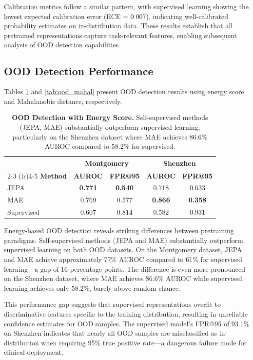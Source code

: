 \documentclass[11pt,a4paper]{article}
\begin{document}
Calibration metrics follow a similar pattern, with supervised learning showing the lowest expected calibration error (ECE = 0.007), indicating well-calibrated probability estimates on in-distribution data. These results establish that all pretrained representations capture task-relevant features, enabling subsequent analysis of OOD detection capabilities.

\subsection{OOD Detection Performance}

Tables \ref{tab:ood_energy} and \ref{tab:ood_mahal} present OOD detection results using energy score and Mahalanobis distance, respectively.

\begin{table}[h]
\centering
\caption{\textbf{OOD Detection with Energy Score.} Self-supervised methods (JEPA, MAE) substantially outperform supervised learning, particularly on the Shenzhen dataset where MAE achieves 86.6\% AUROC compared to 58.2\% for supervised.}
\label{tab:ood_energy}
\begin{tabular}{@{}lcccc@{}}
\toprule
& \multicolumn{2}{c}{\textbf{Montgomery}} & \multicolumn{2}{c}{\textbf{Shenzhen}} \\
\cmidrule(lr){2-3} \cmidrule(lr){4-5}
\textbf{Method} & \textbf{AUROC} & \textbf{FPR@95} & \textbf{AUROC} & \textbf{FPR@95} \\
\midrule
JEPA & \textbf{0.771} & \textbf{0.540} & 0.718 & 0.633 \\
MAE & 0.769 & 0.577 & \textbf{0.866} & \textbf{0.358} \\
Supervised & 0.607 & 0.814 & 0.582 & 0.931 \\
\bottomrule
\end{tabular}
\end{table}

Energy-based OOD detection reveals striking differences between pretraining paradigms. Self-supervised methods (JEPA and MAE) substantially outperform supervised learning on both OOD datasets. On the Montgomery dataset, JEPA and MAE achieve approximately 77\% AUROC compared to 61\% for supervised learning—a gap of 16 percentage points. The difference is even more pronounced on the Shenzhen dataset, where MAE achieves 86.6\% AUROC while supervised learning achieves only 58.2\%, barely above random chance.

This performance gap suggests that supervised representations overfit to discriminative features specific to the training distribution, resulting in unreliable confidence estimates for OOD samples. The supervised model's FPR@95 of 93.1\% on Shenzhen indicates that nearly all OOD samples are misclassified as in-distribution when requiring 95\% true positive rate—a dangerous failure mode for clinical deployment.
\end{document}
